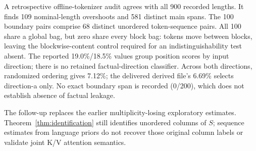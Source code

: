 A retrospective offline-tokenizer audit agrees with all 900 recorded lengths. It finds 109 nominal-length overshoots and 581 distinct main spans. The 100 boundary pairs comprise 68 distinct unordered token-sequence pairs. All 100 share a global bag, but zero share every block bag: tokens move between blocks, leaving the blockwise-content control required for an indistinguishability test absent. The reported 19.0\%/18.5\% values group position scores by input direction; there is no retained factual-direction classifier. Across both directions, randomized ordering gives 7.12\%; the delivered derived file's 6.69\% selects direction-a only. No exact boundary span is recorded (0/200), which does not establish absence of factual leakage.

The follow-up replaces the earlier multiplicity-losing exploratory estimates. Theorem~\ref{thm:identification} still identifies unordered columns of $S$; sequence estimates from language priors do not recover those original column labels or validate joint K/V attention semantics.
